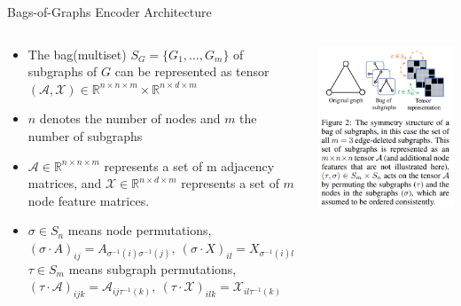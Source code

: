 \documentclass[aspectratio=169,mathserif]{beamer}  %
\newcommand{\R}{\mathbb{R}}
\begin{document}
\begin{frame}{Bags-of-Graphs Encoder Architecture}

\begin{columns}[T]
\begin{column}{0.55\textwidth}
\begin{itemize}[<+->]
    \item The bag(multiset) $S_G=\{G_1,\ldots,G_m\}$ of subgraphs of $G$ can be represented as tensor $(\mathcal{A, X})\in \R^{n\times n \times m}\times \R^{n\times d\times m}$ 
    \item $n$ denotes the number of nodes and $m$ the number of subgraphs
    \item $\mathcal{A}\in\R^{n\times n \times m}$ represents a set of m adjacency matrices, and $\mathcal{X}\in\R^{n\times d \times m}$ represents a set of $m$ node feature matrices. 
    \item $\sigma\in S_n$ means node permutations, $(\sigma\cdot A)_{ij}=A_{\sigma^{-1}(i)\sigma^{-1}(j)},\ (\sigma\cdot X)_{il}=X_{\sigma^{-1}(i)l}$
    $\tau\in S_m$ means subgraph permutations, $(\tau\cdot \mathcal{A})_{ijk}=\mathcal{A}_{ij\tau^{-1}(k)},\ (\tau\cdot \mathcal{X})_{ilk}=\mathcal{X}_{il\tau^{-1}(k)}$
\end{itemize}
\end{column}
\begin{column}{0.4\textwidth}
    \includegraphics[width=\linewidth]{figure2.png}
\end{column}
\end{columns}

\end{frame}
\end{document}
